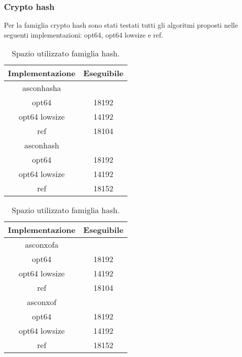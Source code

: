 \subsubsection{Crypto hash}

Per la famiglia crypto hash sono stati testati tutti gli algoritmi proposti nelle seguenti implementazioni: opt64, opt64 lowsize e ref.

\begin{table}[h]
    \caption{Spazio utilizzato famiglia hash.}
    \begin{minipage}[t]{0.5\linewidth}
        \centering
        \begin{tabular}{|c|c|}
            \hline
            Implementazione & Eseguibile \\
            \hline
            asconhasha & \\
            \hline
            opt64 & 18192 \\
            \hline
            opt64 lowsize & 14192 \\
            \hline
            ref & 18104 \\
            \hline
            asconhash & \\
            \hline
            opt64 & 18192 \\
            \hline
            opt64 lowsize & 14192 \\
            \hline
            ref & 18152 \\
            \hline
        \end{tabular}
    \end{minipage}
    \begin{minipage}[t]{0.5\linewidth}
        \centering
        \begin{tabular}{|c|c|}
            \hline
            Implementazione & Eseguibile \\
            \hline
            asconxofa & \\
            \hline
            opt64 & 18192 \\
            \hline
            opt64 lowsize & 14192 \\
            \hline
            ref & 18104 \\
            \hline
            asconxof & \\
            \hline
            opt64 & 18192 \\
            \hline
            opt64 lowsize & 14192 \\
            \hline
            ref & 18152 \\
            \hline
        \end{tabular}
    \end{minipage}
\end{table}

